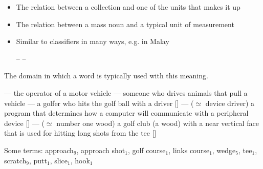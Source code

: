 \documentclass[headrule,footrule]{foils}
\begin{document}

\begin{itemize}
\item The relation between a collection and one of the units that makes it up
  \begin{exe}
    \ex {}
    \ex {}
    \ex {}
    \ex {}
    \ex {}
    \ex {}
    \ex {}
  \end{exe}
\end{itemize}


\begin{itemize}
\item The relation between a mass noun and a typical unit of measurement
  \begin{exe}
    \ex {}
    \ex {}
    \ex {}
    \ex {}
    \ex {}
    \ex {}
  \end{exe}
\item Similar to classifiers in many ways, e.g. in Malay
  \begin{exe}
    \ex {}--
    \ex {}--
  \end{exe}
\end{itemize}

The domain in which a word is typically used with this meaning.

\begin{exe}
  \ex {} --- the operator of a motor vehicle
  \ex {} --- someone who drives animals that pull a vehicle
  \ex {} --- a golfer who hits the golf ball with a driver [] 
  \ex {} --- ($\simeq$ device driver) a program that determines how a computer will communicate with a peripheral device [] 
  \ex {} --- ($\simeq$ number one wood) a golf club (a wood) with a near vertical face that is used for hitting long shots from the tee [] 
\end{exe}

Some  terms: approach$_9$, approach shot$_1$, golf course$_1$, links course$_1$, wedge$_5$, tee$_1$, scratch$_9$, putt$_1$, slice$_1$, hook$_1$
\end{document}

